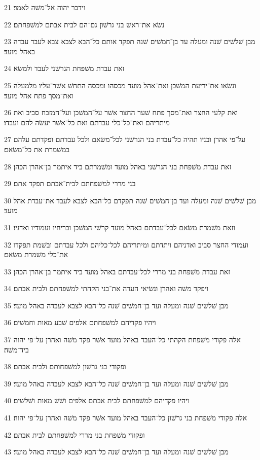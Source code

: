 \par 21 וידבר יהוה אל־משׁה לאמר׃
\par 22 נשׂא את־ראשׁ בני גרשׁון גם־הם לבית אבתם למשׁפחתם׃
\par 23 מבן שׁלשׁים שׁנה ומעלה עד בן־חמשׁים שׁנה תפקד אותם כל־הבא לצבא צבא לעבד עבדה באהל מועד׃
\par 24 זאת עבדת משׁפחת הגרשׁני לעבד ולמשׂא׃
\par 25 ונשׂאו את־יריעת המשׁכן ואת־אהל מועד מכסהו ומכסה התחשׁ אשׁר־עליו מלמעלה ואת־מסך פתח אהל מועד׃
\par 26 ואת קלעי החצר ואת־מסך פתח שׁער החצר אשׁר על־המשׁכן ועל־המזבח סביב ואת מיתריהם ואת־כל־כלי עבדתם ואת כל־אשׁר יעשׂה להם ועבדו׃
\par 27 על־פי אהרן ובניו תהיה כל־עבדת בני הגרשׁני לכל־משׂאם ולכל עבדתם ופקדתם עלהם במשׁמרת את כל־משׂאם׃
\par 28 זאת עבדת משׁפחת בני הגרשׁני באהל מועד ומשׁמרתם ביד איתמר בן־אהרן הכהן׃
\par 29 בני מררי למשׁפחתם לבית־אבתם תפקד אתם׃
\par 30 מבן שׁלשׁים שׁנה ומעלה ועד בן־חמשׁים שׁנה תפקדם כל־הבא לצבא לעבד את־עבדת אהל מועד׃
\par 31 וזאת משׁמרת משׂאם לכל־עבדתם באהל מועד קרשׁי המשׁכן ובריחיו ועמודיו ואדניו׃
\par 32 ועמודי החצר סביב ואדניהם ויתדתם ומיתריהם לכל־כליהם ולכל עבדתם ובשׁמת תפקדו את־כלי משׁמרת משׂאם׃
\par 33 זאת עבדת משׁפחת בני מררי לכל־עבדתם באהל מועד ביד איתמר בן־אהרן הכהן׃
\par 34 ויפקד משׁה ואהרן ונשׂיאי העדה את־בני הקהתי למשׁפחתם ולבית אבתם׃
\par 35 מבן שׁלשׁים שׁנה ומעלה ועד בן־חמשׁים שׁנה כל־הבא לצבא לעבדה באהל מועד׃
\par 36 ויהיו פקדיהם למשׁפחתם אלפים שׁבע מאות וחמשׁים׃
\par 37 אלה פקודי משׁפחת הקהתי כל־העבד באהל מועד אשׁר פקד משׁה ואהרן על־פי יהוה ביד־משׁה׃
\par 38 ופקודי בני גרשׁון למשׁפחותם ולבית אבתם׃
\par 39 מבן שׁלשׁים שׁנה ומעלה ועד בן־חמשׁים שׁנה כל־הבא לצבא לעבדה באהל מועד׃
\par 40 ויהיו פקדיהם למשׁפחתם לבית אבתם אלפים ושׁשׁ מאות ושׁלשׁים׃
\par 41 אלה פקודי משׁפחת בני גרשׁון כל־העבד באהל מועד אשׁר פקד משׁה ואהרן על־פי יהוה׃
\par 42 ופקודי משׁפחת בני מררי למשׁפחתם לבית אבתם׃
\par 43 מבן שׁלשׁים שׁנה ומעלה ועד בן־חמשׁים שׁנה כל־הבא לצבא לעבדה באהל מועד׃
